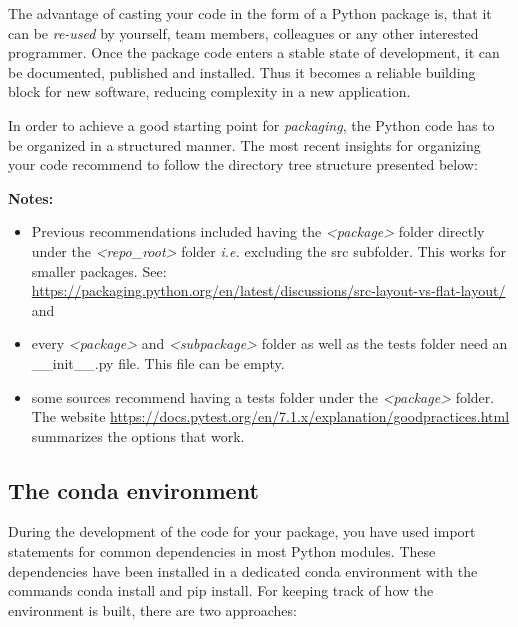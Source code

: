 The advantage of casting your code in the form of a Python package is, that it can be \emph{re-used} by yourself, team members, colleagues or any other interested programmer. Once the package code enters a stable state of development, it can be documented, published and installed. Thus it becomes a reliable building block for new software, reducing complexity in a new application.

In order to achieve a good starting point for \emph{packaging}, the Python code has to be organized in a structured manner. The most recent insights for organizing your code recommend to follow the directory tree structure presented below: \\


\textbf{Notes:} 
\begin{itemize}
	\item Previous recommendations included having the \textit{\textless package\textgreater} folder directly under the \textit{\textless repo\_root\textgreater} folder \textit{i.e.} excluding the \textsf{src} subfolder. This works for smaller packages. See: \url{https://packaging.python.org/en/latest/discussions/src-layout-vs-flat-layout/} and 
	\item every \textit{\textless package\textgreater} and \textit{\textless subpackage\textgreater} folder as well as the \textsf{tests} folder need an \textsf{\_\_init\_\_.py} file. This file can be empty.
	\item some sources recommend having a \textsf{tests} folder under the \textit{\textless package\textgreater} folder. The website \url{https://docs.pytest.org/en/7.1.x/explanation/goodpractices.html} summarizes the options that work.
\end{itemize}

\subsection{The \textsf{conda} environment}

During the development of the code for your package, you have used \textsf{import} statements for common dependencies in most Python modules. These dependencies have been installed in a dedicated \textsf{conda} environment with the commands \textsf{conda install} and \textsf{pip install}. For keeping track of how the environment is built, there are two approaches:

